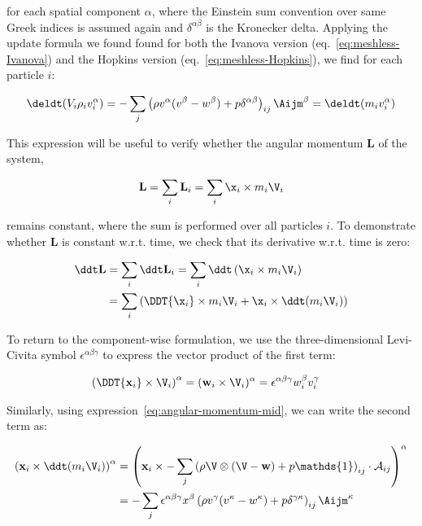 for each spatial component $\alpha$, where the Einstein sum convention over same Greek indices is
assumed again and $\delta^{\alpha \beta}$ is the Kronecker delta. Applying the update formula we
found found for both the Ivanova version (eq.~\ref{eq:meshless-Ivanova}) and the Hopkins version
(eq.~\ref{eq:meshless-Hopkins}), we find for each particle $i$:

\begin{align}
\deldt (V_i \rho_i v_i^\alpha)
= - \sum_j \left( \rho v^\alpha  (v^\beta - w^\beta)  + p \delta^{\alpha\beta} \right)_{ij}
\Aijm^\beta
= \deldt(m_i v_i^\alpha)
\label{eq:angular-momentum-mid}
\end{align}

This expression will be useful to verify whether the angular momentum $\mathbf{L}$ of the
system,

\begin{align}
\mathbf{L} = \sum_i \mathbf{L}_i = \sum_i \x_i \times m_i \V_i
\end{align}

remains constant, where the sum is performed over all particles $i$. To demonstrate whether
$\mathbf{L}$ is constant w.r.t. time, we check that its derivative w.r.t. time is zero:

\begin{align}
\ddt \mathbf{L} &=
    \sum_i \ddt \mathbf{L}_i = \sum_i \ddt \left( \x_i \times m_i \V_i \right) \\
&= \sum_i \left( \DDT{\x_i} \times m_i \V_i + \x_i \times \ddt (m_i \V_i) \right)
\end{align}

To return to the component-wise formulation, we use the three-dimensional Levi-Civita symbol $\epsilon^{\alpha \beta \gamma}$ to express the vector product of the first term:

\begin{align}
\left(\DDT{\mathbf{x}_i} \times \V_i \right)^\alpha &=
    (\mathbf{w}_i \times \V_i)^\alpha =
    \epsilon^{\alpha \beta \gamma} w_i^\beta v_i^\gamma
\end{align}

Similarly, using expression~\ref{eq:angular-momentum-mid}, we can write the second term as:

\begin{align}
\left(\mathbf{x}_i \times \ddt (m_i \V_i)\right)^\alpha &=
\left(\mathbf{x}_i \times - \sum_j \left( \rho \V \otimes (\V - \mathbf{w}) + p
\mathds{1}\right)_{ij} \cdot \mathbf{\mathcal{A}}_{ij} \right)^\alpha \\
&= -\sum_j \epsilon^{\alpha \beta \gamma}  x^\beta
\left( \rho v^\gamma (v^\kappa - w^\kappa) + p \delta^{\gamma\kappa} \right)_{ij} \Aijm^\kappa
\end{align}

